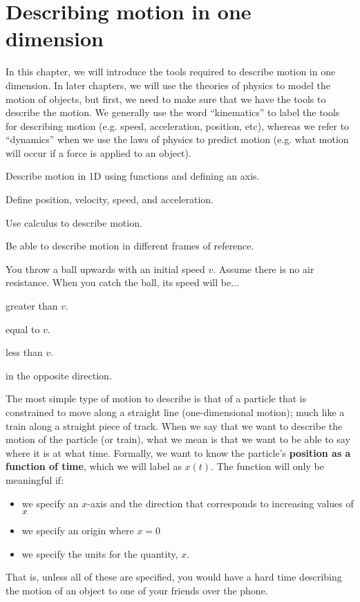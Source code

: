 \chapter{Describing motion in one dimension}
\label{chapter:describingmotionin1d}
In this chapter, we will introduce the tools required to describe motion in one dimension. In later chapters, we will use the theories of physics to model the motion of objects, but first, we need to make sure that we have the tools to describe the motion. We generally use the word ``kinematics'' to label the tools for describing motion (e.g. speed, acceleration, position, etc), whereas we refer to ``dynamics'' when we use the laws of physics to predict motion (e.g. what motion will occur if a force is applied to an object). 

\begin{learningObjectives}
{\item Describe motion in 1D using functions and defining an axis.
\item Define position, velocity, speed, and acceleration.
\item Use calculus to describe motion.
\item Be able to describe motion in different frames of reference.
}
\end{learningObjectives}

\begin{opening}
\begin{MCquestion} {You throw a ball upwards with an initial speed $v$. Assume there is no air resistance. When you catch the ball, its speed will be...}
\item greater than $v$.
\item equal to $v$. \correct
\item less than $v$.
\item in the opposite direction.
\end{MCquestion}
\end{opening}

The most simple type of motion to describe is that of a particle that is constrained to move along a straight line (one-dimensional motion); much like a train along a straight piece of track. When we say that we want to describe the motion of the particle (or train), what we mean is that we want to be able to say where it is at what time. Formally, we want to know the particle's \textbf{position as a function of time}, which we will label as $x(t)$. The function will only be meaningful if:
\begin{itemize}
\item we specify an $x$-axis and the direction that corresponds to increasing values of $x$
\item we specify an origin where $x=0$
\item we specify the units for the quantity, $x$.
\end{itemize}
That is, unless all of these are specified, you would have a hard time describing the motion of an object to one of your friends over the phone. 

